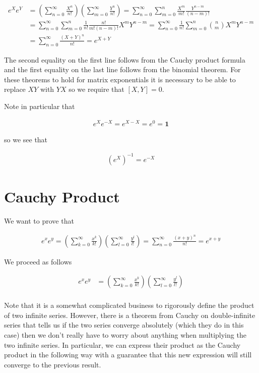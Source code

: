 \documentclass[12pt]{article}
\newcommand{\bv}[1]{\boldsymbol{#1}}
\begin{document}
\begin{align}
e^X e^Y &= \left(\sum_{n=0}^{\infty}  \frac{X^n}{n!} \right)\left(\sum_{m=0}^{\infty} \frac{Y^n}{n!}\right) = \sum_{n=0}^{\infty} \sum_{m=0}^n \frac{X^m}{m!} \frac{Y^{n-m}}{(n-m)!}\\
&= \sum_{n=0}^{\infty}\sum_{m=0}^n \frac{1}{n!} \frac{n!}{m!(n-m)!} X^m Y^{n-m} = \sum_{n=0}^{\infty}\frac{1}{n!}\sum_{m=0}^n \binom{n}{m} X^m Y^{n-m}\\
&= \sum_{n=0}^{\infty} \frac{(X+Y)^n}{n!} = e^{X+Y}
\end{align}

The second equality on the first line follows from the Cauchy product formula and the first equality on the last line follows from the binomial theorem. For these theorems to hold for matrix exponentials it is necessary to be able to replace $XY$ with $YX$ so we require that $[X,Y] = 0$. 

Note in particular that

\begin{align}
e^{X}e^{-X} = e^{X-X} = e^0 = \bv{1}
\end{align}

so we see that

\begin{align}
\left(e^{X}\right)^{-1} = e^{-X}
\end{align}

\section{Cauchy Product}

We want to prove that

\begin{align}
e^x e^y = \left(\sum_{k=0}^{\infty} \frac{x^k}{k!} \right) \left(\sum_{l=0}^{\infty} \frac{y^l}{l!} \right) = \sum_{n=0}^{\infty} \frac{(x+y)^n}{n!} = e^{x+y}
\end{align}

We proceed as follows

\begin{align}
e^x e^y &= \left(\sum_{k=0}^{\infty} \frac{x^k}{k!} \right) \left(\sum_{l=0}^{\infty} \frac{y^l}{l!} \right)\\
\end{align}

Note that it is a somewhat complicated business to rigorously define the product of two infinite series. However, there is a theorem from Cauchy on double-infinite series that tells us if the two series converge absolutely (which they do in this case) then we don't really have to worry about anything when multiplying the two infinite series. In particular, we can express their product as the Cauchy product in the following way with a guarantee that this new expression will still converge to the previous result.
\end{document}
